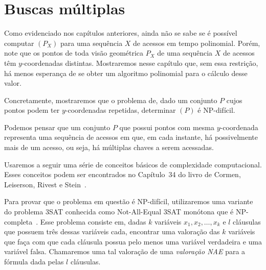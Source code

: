 
\chapter{Buscas múltiplas}
\label{cap:buscas-multiplas}





Como evidenciado nos capítulos anteriores, ainda não se sabe se é possível computar \minASS$(P_X)$ para uma sequência $X$ de acessos em tempo polinomial. Porém, note que os pontos de toda visão geométrica $P_X$ de uma sequência $X$ de acessos têm $y$-coordenadas distintas. Mostraremos nesse capítulo que, sem essa restrição, há menos esperança de se obter um algoritmo polinomial para o cálculo desse valor.

Concretamente, mostraremos que o problema de, dado um conjunto $P$ cujos pontos podem ter $y$-coordenadas repetidas, determinar \minASS$(P)$ é NP-difícil.

Podemos pensar que um conjunto $P$ que possui pontos com mesma $y$-coordenada representa uma sequência de acessos em que, em cada instante, há possivelmente mais de um acesso, ou seja, há múltiplas chaves a serem acessadas.

Usaremos a seguir uma série de conceitos básicos de complexidade computacional. Esses conceitos podem ser encontrados no Capítulo~34 do livro de Cormen, Leiserson, Rivest e Stein~\cite{CLRS}.


Para provar que o problema em questão é NP-difícil, utilizaremos uma variante do problema 3SAT conhecida como Not-All-Equal 3SAT monótona que é NP-completa~\cite{3SATNAE}. %
Esse problema consiste em, dadas $k$ variáveis $x_1, x_2, \ldots, x_k$ e $l$ cláusulas que possuem três dessas variáveis cada, encontrar uma valoração das $k$ variáveis que faça com que cada cláusula possua pelo menos uma variável verdadeira e uma variável falsa. Chamaremos uma tal valoração de uma \textit{valoração NAE} para a fórmula dada pelas $l$ cláusulas.

